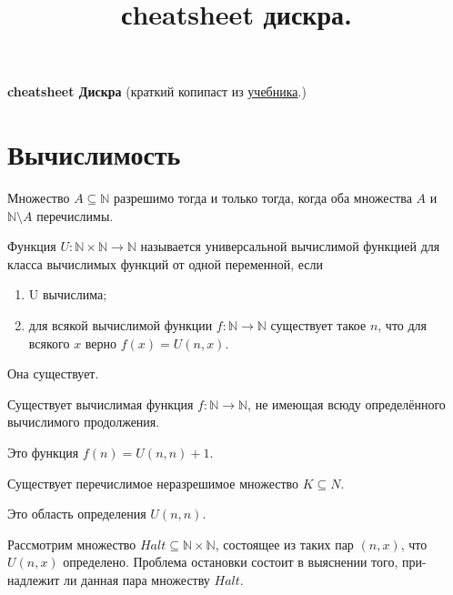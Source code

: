 \documentclass{article}
\title{сheatsheet дискра.}
\newcommand{\N}{\mathbb{N}}
\newenvironment{theorem}[2][Т]{\begin{trivlist}
\item[\hskip \labelsep {\bfseries #1}\hskip \labelsep {\bfseries #2.}]}{\end{trivlist}}
\newenvironment{definition}[2][О]{\begin{trivlist}
\item[\hskip \labelsep {\bfseries #1}\hskip \labelsep {\bfseries #2}]}{\end{trivlist}}
\begin{document}
{\center \textbf{\LARGE cheatsheet Дискра} (краткий копипаст из \href{http://rubtsov.su/public/hse/2017/DM-HSE-Draft.pdf}{\underline{учебника}}.)}

\section{Вычислимость}
\begin{theorem}{Поста}
Множество $A \subseteq \N$ разрешимо тогда и только
тогда, когда оба множества $A$ и $\N \setminus A$ перечислимы.
\end{theorem}

\begin{definition}{Универсальная вычислимая функция.}
Функция  $U : \N \times \N \to \N$ называется универсальной вычислимой
функцией для класса вычислимых функций от одной переменной, если
\begin{enumerate}
  \item U вычислима;
  \item для всякой вычислимой функции $f : \N \to \N$ существует такое $n$, что для всякого $x$ верно $f(x) = U(n, x)$.
\end{enumerate}

Она существует.
\end{definition}

\begin{theorem}{Функция без всюду
определённого вычислимого продолжения}
Существует вычислимая функция $f : \N \to \N$, не имеющая всюду
определённого вычислимого продолжения.

Это функция $f(n) = U(n, n) + 1$.
\end{theorem}

\begin{theorem}{Перечислимое неразрешимое множество}
Существует перечислимое неразрешимое множество $K \subseteq N$.

Это область определения $U(n, n)$.
\end{theorem}

\begin{definition}{Проблема остановки}
Рассмотрим множество $Halt \subseteq \N \times \N$, состоящее из таких пар
$(n, x)$, что $U(n, x)$ определено. Проблема остановки состоит в выяснении того, при-
надлежит ли данная пара множеству $Halt$.
\end{definition}
\end{document}
